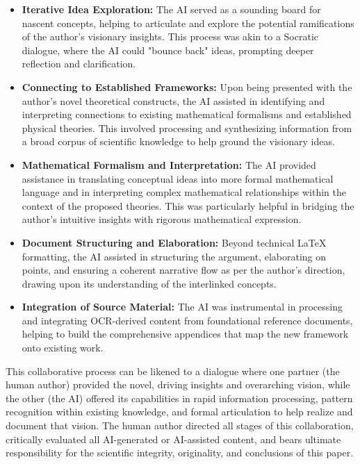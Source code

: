 \documentclass[11pt,a4paper]{article}
\begin{document}
\begin{itemize}
    \item \textbf{Iterative Idea Exploration:} The AI served as a sounding board for nascent concepts, helping to articulate and explore the potential ramifications of the author's visionary insights. This process was akin to a Socratic dialogue, where the AI could "bounce back" ideas, prompting deeper reflection and clarification.
    \item \textbf{Connecting to Established Frameworks:} Upon being presented with the author's novel theoretical constructs, the AI assisted in identifying and interpreting connections to existing mathematical formalisms and established physical theories. This involved processing and synthesizing information from a broad corpus of scientific knowledge to help ground the visionary ideas.
    \item \textbf{Mathematical Formalism and Interpretation:} The AI provided assistance in translating conceptual ideas into more formal mathematical language and in interpreting complex mathematical relationships within the context of the proposed theories. This was particularly helpful in bridging the author's intuitive insights with rigorous mathematical expression.
    \item \textbf{Document Structuring and Elaboration:} Beyond technical LaTeX formatting, the AI assisted in structuring the argument, elaborating on points, and ensuring a coherent narrative flow as per the author's direction, drawing upon its understanding of the interlinked concepts.
    \item \textbf{Integration of Source Material:} The AI was instrumental in processing and integrating OCR-derived content from foundational reference documents, helping to build the comprehensive appendices that map the new framework onto existing work.
\end{itemize}

This collaborative process can be likened to a dialogue where one partner (the human author) provided the novel, driving insights and overarching vision, while the other (the AI) offered its capabilities in rapid information processing, pattern recognition within existing knowledge, and formal articulation to help realize and document that vision. The human author directed all stages of this collaboration, critically evaluated all AI-generated or AI-assisted content, and bears ultimate responsibility for the scientific integrity, originality, and conclusions of this paper.
\end{document}
